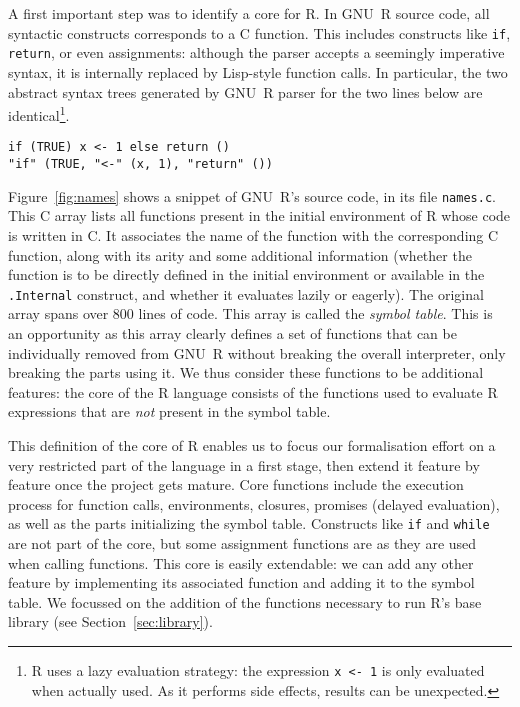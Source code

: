 \documentclass[
    sigplan,
    10pt,
    review, %
    natbib=false %
 ]{acmart}
\begin{document}
A first important step was to identify a core for R.
%
In GNU~R source code, all syntactic constructs corresponds to a C function.
This includes constructs like \texttt{if}, %
\texttt{return}, or even assignments:
although the parser accepts a seemingly imperative syntax,
it is internally replaced by Lisp-style function calls.
In particular, the two abstract syntax trees generated
by GNU~R parser for the two lines below are identical\footnote{
    R uses a lazy evaluation strategy:
    the expression \texttt{x <- 1} is only evaluated
    when actually used.
    As it performs side effects, results can be unexpected.
}.
\begin{verbatim}
if (TRUE) x <- 1 else return ()
"if" (TRUE, "<-" (x, 1), "return" ())
\end{verbatim}
Figure~\ref{fig:names} shows a snippet of GNU~R's source code,
in its file \texttt{names.c}.
This C array lists all functions present in the initial environment
of R whose code is written in C.
It associates the name of the function with the corresponding C function,
along with its arity and some additional information
(whether the function is to be directly defined in the initial environment
or available in the \texttt{.Internal} construct,
and whether it evaluates lazily or eagerly).
The original array spans over 800 lines of code.
This array is called the \emph{symbol table}.
%
This is an opportunity as this array clearly defines a set of functions
that can be individually removed from GNU~R without breaking the overall
interpreter, only breaking the parts using it.
We thus consider these functions to be additional features:
the core of the R language consists of the functions used to evaluate R expressions
that are \emph{not} present in the symbol table.

This definition of the core of R enables us to focus
our formalisation effort on a very restricted part of the language
in a first stage,
then extend it feature by feature once the project gets mature.
Core functions include the execution process for function calls,
environments, closures, promises (delayed evaluation),
as well as the parts initializing the symbol table.
Constructs like \texttt{if} and \texttt{while}
are not part of the core,
but some assignment functions are
as they are used when calling functions.
%
This core is easily extendable:
we can add any other feature by implementing
its associated function and adding it to the symbol table.
We focussed on the addition of the functions necessary to
run R's base library (see Section~\ref{sec:library}).
\end{document}

